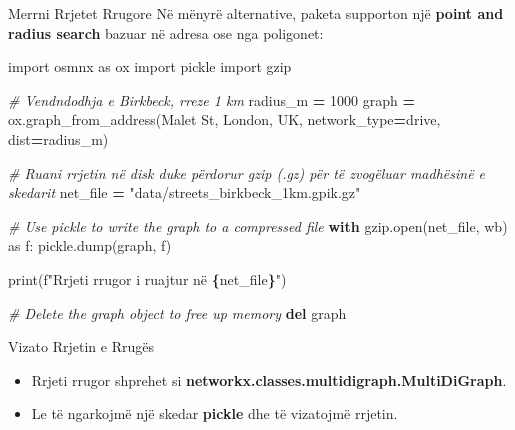 \documentclass[
  ignorenonframetext,
]{beamer}
\newenvironment{Shaded}{\begin{snugshade}}{\end{snugshade}}
\newcommand{\BuiltInTok}[1]{#1}
\newcommand{\CommentTok}[1]{\textcolor[rgb]{0.56,0.35,0.01}{\textit{#1}}}
\newcommand{\ControlFlowTok}[1]{\textcolor[rgb]{0.13,0.29,0.53}{\textbf{#1}}}
\newcommand{\DecValTok}[1]{\textcolor[rgb]{0.00,0.00,0.81}{#1}}
\newcommand{\ImportTok}[1]{#1}
\newcommand{\KeywordTok}[1]{\textcolor[rgb]{0.13,0.29,0.53}{\textbf{#1}}}
\newcommand{\NormalTok}[1]{#1}
\newcommand{\OperatorTok}[1]{\textcolor[rgb]{0.81,0.36,0.00}{\textbf{#1}}}
\newcommand{\SpecialCharTok}[1]{\textcolor[rgb]{0.81,0.36,0.00}{\textbf{#1}}}
\newcommand{\SpecialStringTok}[1]{\textcolor[rgb]{0.31,0.60,0.02}{#1}}
\newcommand{\StringTok}[1]{\textcolor[rgb]{0.31,0.60,0.02}{#1}}
\begin{document}
\begin{frame}[fragile]{Merrni Rrjetet Rrugore}
\protect\hypertarget{merrni-rrjetet-rrugore-2}{}
Në mënyrë alternative, paketa supporton një \textbf{point and radius
search} bazuar në adresa ose nga poligonet:


\begin{Shaded}
\begin{Highlighting}[]
\ImportTok{import}\NormalTok{ osmnx }\ImportTok{as}\NormalTok{ ox}
\ImportTok{import}\NormalTok{ pickle}
\ImportTok{import}\NormalTok{ gzip}

\CommentTok{\# Vendndodhja e Birkbeck, rreze 1 km}
\NormalTok{radius\_m }\OperatorTok{=} \DecValTok{1000}
\NormalTok{graph }\OperatorTok{=}\NormalTok{ ox.graph\_from\_address(}\StringTok{\textquotesingle{}Malet St, London, UK\textquotesingle{}}\NormalTok{, network\_type}\OperatorTok{=}\StringTok{\textquotesingle{}drive\textquotesingle{}}\NormalTok{, dist}\OperatorTok{=}\NormalTok{radius\_m)}

\CommentTok{\# Ruani rrjetin në disk duke përdorur gzip (.gz) për të zvogëluar madhësinë e skedarit}
\NormalTok{net\_file }\OperatorTok{=} \StringTok{"data/streets\_birkbeck\_1km.gpik.gz"}

\CommentTok{\# Use pickle to write the graph to a compressed file}
\ControlFlowTok{with}\NormalTok{ gzip.}\BuiltInTok{open}\NormalTok{(net\_file, }\StringTok{\textquotesingle{}wb\textquotesingle{}}\NormalTok{) }\ImportTok{as}\NormalTok{ f:}
\NormalTok{    pickle.dump(graph, f)}

\BuiltInTok{print}\NormalTok{(}\SpecialStringTok{f"Rrjeti rrugor i ruajtur në }\SpecialCharTok{\{}\NormalTok{net\_file}\SpecialCharTok{\}}\SpecialStringTok{"}\NormalTok{)}

\CommentTok{\# Delete the graph object to free up memory}
\KeywordTok{del}\NormalTok{ graph}
\end{Highlighting}
\end{Shaded}
\end{frame}

\begin{frame}{Vizato Rrjetin e Rrugës}
\protect\hypertarget{vizato-rrjetin-e-rruguxebs}{}
\begin{itemize}
\item
  Rrjeti rrugor shprehet si
  \textbf{networkx.classes.multidigraph.MultiDiGraph}.
\item
  Le të ngarkojmë një skedar \textbf{pickle} dhe të vizatojmë rrjetin.
\end{itemize}
\end{frame}
\end{document}
